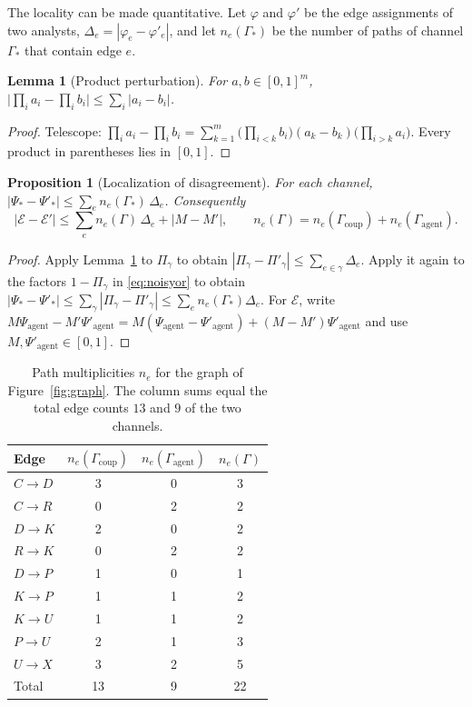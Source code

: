 \documentclass[11pt]{article}
\newtheorem{lemma}{Lemma}[section]
\newtheorem{proposition}{Proposition}[section]
\theoremstyle{remark}
\begin{document}
The locality can be made quantitative. Let $\varphi$ and $\varphi'$ be the edge assignments of two analysts, $\Delta_e=|\varphi_e-\varphi'_e|$, and let $n_e(\Gamma_\ast)$ be the number of paths of channel $\Gamma_\ast$ that contain edge $e$.

\begin{lemma}[Product perturbation]\label{lem:prodpert}
For $a,b\in[0,1]^m$, $\bigl|\prod_i a_i-\prod_i b_i\bigr|\le\sum_i|a_i-b_i|$.
\end{lemma}
\begin{proof}
Telescope: $\prod_i a_i-\prod_i b_i=\sum_{k=1}^{m}\bigl(\prod_{i<k}b_i\bigr)(a_k-b_k)\bigl(\prod_{i>k}a_i\bigr)$. Every product in parentheses lies in $[0,1]$. \qedhere
\end{proof}

\begin{proposition}[Localization of disagreement]\label{prop:local}
For each channel, $|\Psi_\ast-\Psi'_\ast|\le\sum_e n_e(\Gamma_\ast)\,\Delta_e$. Consequently
\begin{equation}
|\mathcal{E}-\mathcal{E}'|\le\sum_e n_e(\Gamma)\,\Delta_e+|M-M'|,\qquad n_e(\Gamma)=n_e(\Gamma_{\mathrm{coup}})+n_e(\Gamma_{\mathrm{agent}}).
\end{equation}
\end{proposition}
\begin{proof}
Apply Lemma~\ref{lem:prodpert} to $\Pi_\gamma$ to obtain $|\Pi_\gamma-\Pi'_\gamma|\le\sum_{e\in\gamma}\Delta_e$. Apply it again to the factors $1-\Pi_\gamma$ in \eqref{eq:noisyor} to obtain $|\Psi_\ast-\Psi'_\ast|\le\sum_{\gamma}|\Pi_\gamma-\Pi'_\gamma|\le\sum_e n_e(\Gamma_\ast)\Delta_e$. For $\mathcal{E}$, write $M\Psi_{\mathrm{agent}}-M'\Psi'_{\mathrm{agent}}=M(\Psi_{\mathrm{agent}}-\Psi'_{\mathrm{agent}})+(M-M')\Psi'_{\mathrm{agent}}$ and use $M,\Psi'_{\mathrm{agent}}\in[0,1]$. \qedhere
\end{proof}

\begin{table}[h]
\centering
\caption{Path multiplicities $n_e$ for the graph of Figure~\ref{fig:graph}. The column sums equal the total edge counts $13$ and $9$ of the two channels.}\label{tab:multiplicity}
\begin{tabular}{@{}lccc@{}}
\toprule
Edge & $n_e(\Gamma_{\mathrm{coup}})$ & $n_e(\Gamma_{\mathrm{agent}})$ & $n_e(\Gamma)$ \\
\midrule
$C\to D$ & 3 & 0 & 3 \\
$C\to R$ & 0 & 2 & 2 \\
$D\to K$ & 2 & 0 & 2 \\
$R\to K$ & 0 & 2 & 2 \\
$D\to P$ & 1 & 0 & 1 \\
$K\to P$ & 1 & 1 & 2 \\
$K\to U$ & 1 & 1 & 2 \\
$P\to U$ & 2 & 1 & 3 \\
$U\to X$ & 3 & 2 & 5 \\
\midrule
Total & 13 & 9 & 22 \\
\bottomrule
\end{tabular}
\end{table}
\end{document}
